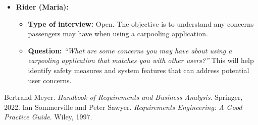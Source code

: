 \documentclass[12pt,letterpaper]{article}
\begin{document}
\begin{itemize}
    \item \textbf{Rider (Maria):}
    \begin{itemize}
        \item \textbf{Type of interview:} Open. The objective is to understand any concerns passengers may have when using a carpooling application.
        \item \textbf{Question:} \textit{“What are some concerns you may have about using a carpooling application that matches you with other users?”}  
        This will help identify safety measures and system features that can address potential user concerns.
    \end{itemize}
\end{itemize}

\clearpage

\begin{thebibliography}{9}
 Bertrand Meyer. \textit{Handbook of Requirements and Business Analysis}. Springer, 2022.
 Ian Sommerville and Peter Sawyer. \textit{Requirements Engineering: A Good Practice Guide}. Wiley, 1997.
\end{thebibliography}

\clearpage
\end{document}
